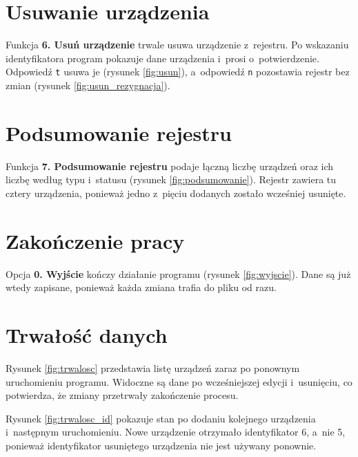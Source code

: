 
\section{Usuwanie urządzenia}

Funkcja \textbf{6. Usuń urządzenie} trwale usuwa urządzenie z~rejestru. Po wskazaniu identyfikatora program pokazuje dane urządzenia i~prosi o~potwierdzenie. Odpowiedź \texttt{t} usuwa je (rysunek \ref{fig:usun}), a~odpowiedź \texttt{n} pozostawia rejestr bez zmian (rysunek \ref{fig:usun_rezygnacja}).


\section{Podsumowanie rejestru}

Funkcja \textbf{7. Podsumowanie rejestru} podaje łączną liczbę urządzeń oraz ich liczbę według typu i~statusu (rysunek \ref{fig:podsumowanie}). Rejestr zawiera tu cztery urządzenia, ponieważ jedno z~pięciu dodanych zostało wcześniej usunięte.


\section{Zakończenie pracy}

Opcja \textbf{0. Wyjście} kończy działanie programu (rysunek \ref{fig:wyjscie}). Dane są już wtedy zapisane, ponieważ każda zmiana trafia do pliku od razu.


\section{Trwałość danych}

Rysunek \ref{fig:trwalosc} przedstawia listę urządzeń zaraz po ponownym uruchomieniu programu. Widoczne są dane po wcześniejszej edycji i~usunięciu, co potwierdza, że zmiany przetrwały zakończenie procesu.


Rysunek \ref{fig:trwalosc_id} pokazuje stan po dodaniu kolejnego urządzenia i~następnym uruchomieniu. Nowe urządzenie otrzymało identyfikator 6, a~nie 5, ponieważ identyfikator usuniętego urządzenia nie jest używany ponownie.

